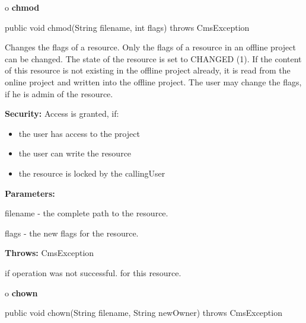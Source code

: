 o {\bf chmod} 

\begin{PRE}
 public void chmod(String filename,
                   int flags) throws CmsException
\end{PRE}

\begin{description}
\htmlDD Changes the flags of a resource. \htmlBR
Only the flags of a resource in an offline project can be changed. The state
of the resource is set to CHANGED (1). If the content of this resource is not
existing in the offline project already, it is read from the online project
and written into the offline project. The user may change the flags, if he is
admin of the resource. 

{\bf Security:} Access is granted, if: 

\begin{itemize}
\item the user has access to the project 
\item the user can write the resource 
\item the resource is locked by the callingUser 
\end{itemize}

\begin{description}
\item {\bf Parameters:}  

filename - the complete path to the resource.  

flags - the new flags for the resource.  
\item {\bf Throws:} CmsException  

if operation was not successful. for this resource.  
\end{description}

\end{description}

o {\bf chown} 

\begin{PRE}
 public void chown(String filename,
                   String newOwner) throws CmsException
\end{PRE}

